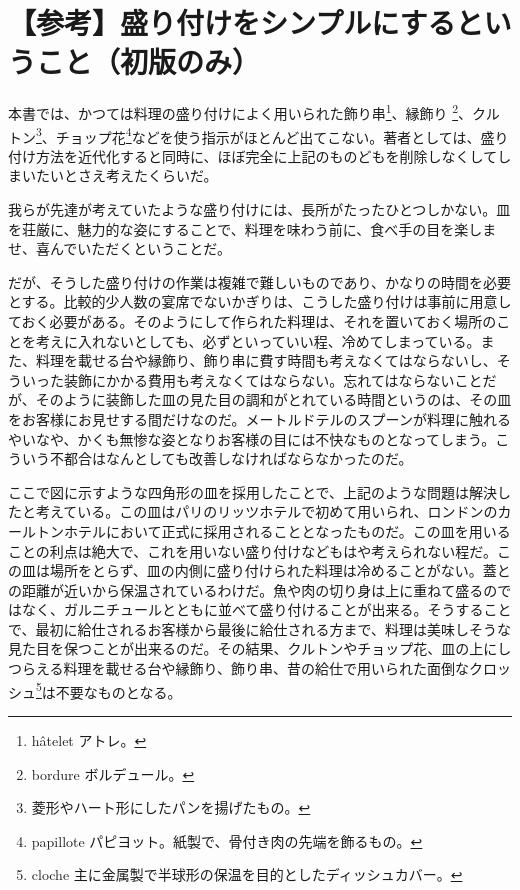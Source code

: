 \newpage
\small
{}

\hypertarget{remarque-sur-la-simplification-des-procedes-de-dressage}{%
\section{【参考】盛り付けをシンプルにするということ（初版のみ）}\label{remarque-sur-la-simplification-des-procedes-de-dressage}}

\begin{main}

本書では、かつては料理の盛り付けによく用いられた飾り串\footnote{hâtelet
  アトレ。}、縁飾り \footnote{bordure ボルデュール。}、クルトン\footnote{菱形やハート形にしたパンを揚げたもの。}、チョップ花\footnote{papillote
  パピヨット。紙製で、骨付き肉の先端を飾るもの。}などを使う指示がほとんど出てこない。著者としては、盛り付け方法を近代化すると同時に、ほぼ完全に上記のものどもを削除しなくしてしまいたいとさえ考えたくらいだ。

我らが先達が考えていたような盛り付けには、長所がたったひとつしかない。皿を荘厳に、魅力的な姿にすることで、料理を味わう前に、食べ手の目を楽しませ、喜んでいただくということだ。

だが、そうした盛り付けの作業は複雑で難しいものであり、かなりの時間を必要とする。比較的少人数の宴席でないかぎりは、こうした盛り付けは事前に用意しておく必要がある。そのようにして作られた料理は、それを置いておく場所のことを考えに入れないとしても、必ずといっていい程、冷めてしまっている。また、料理を載せる台や縁飾り、飾り串に費す時間も考えなくてはならないし、そういった装飾にかかる費用も考えなくてはならない。忘れてはならないことだが、そのように装飾した皿の見た目の調和がとれている時間というのは、その皿をお客様にお見せする間だけなのだ。メートルドテルのスプーンが料理に触れるやいなや、かくも無惨な姿となりお客様の目には不快なものとなってしまう。こういう不都合はなんとしても改善しなければならなかったのだ。

ここで図に示すような四角形の皿を採用したことで、上記のような問題は解決したと考えている。この皿はパリのリッツホテルで初めて用いられ、ロンドンのカールトンホテルにおいて正式に採用されることとなったものだ。この皿を用いることの利点は絶大で、これを用いない盛り付けなどもはや考えられない程だ。この皿は場所をとらず、皿の内側に盛り付けられた料理は冷めることがない。蓋との距離が近いから保温されているわけだ。魚や肉の切り身は上に重ねて盛るのではなく、ガルニチュールとともに並べて盛り付けることが出来る。そうすることで、最初に給仕されるお客様から最後に給仕される方まで、料理は美味しそうな見た目を保つことが出来るのだ。その結果、クルトンやチョップ花、皿の上にしつらえる料理を載せる台や縁飾り、飾り串、昔の給仕で用いられた面倒なクロッシュ\footnote{cloche
  主に金属製で半球形の保温を目的としたディッシュカバー。}は不要なものとなる。


\end{main}

